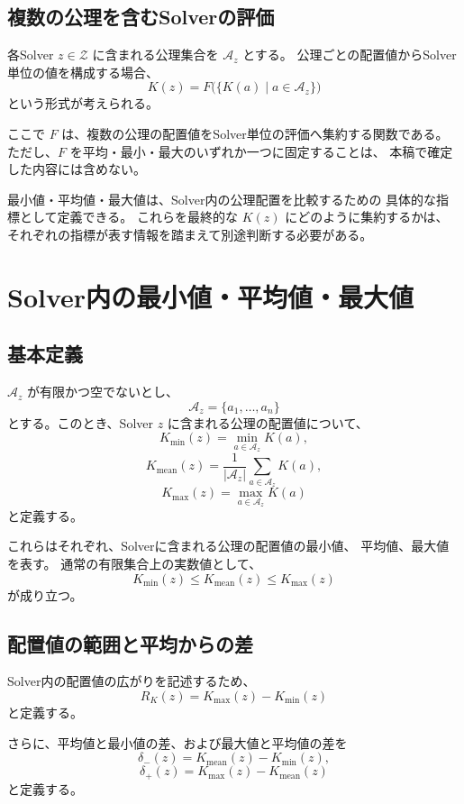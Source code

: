 \documentclass[a4paper,12pt]{article}
\begin{document}
\subsection{複数の公理を含むSolverの評価}

各Solver $z\in\mathcal{Z}$ に含まれる公理集合を
$\mathcal{A}_z$ とする。
公理ごとの配置値からSolver単位の値を構成する場合、
\[
    K(z)=F\bigl(\{K(a)\mid a\in\mathcal{A}_z\}\bigr)
\]
という形式が考えられる。

ここで $F$ は、複数の公理の配置値をSolver単位の評価へ集約する関数である。
ただし、$F$ を平均・最小・最大のいずれか一つに固定することは、
本稿で確定した内容には含めない。

最小値・平均値・最大値は、Solver内の公理配置を比較するための
具体的な指標として定義できる。
これらを最終的な $K(z)$ にどのように集約するかは、
それぞれの指標が表す情報を踏まえて別途判断する必要がある。

\section{Solver内の最小値・平均値・最大値}

\subsection{基本定義}

$\mathcal{A}_z$ が有限かつ空でないとし、
\[
    \mathcal{A}_z=\{a_1,\ldots,a_n\}
\]
とする。このとき、Solver $z$ に含まれる公理の配置値について、
\[
    K_{\min}(z)
    =
    \min_{a\in\mathcal{A}_z}K(a),
\]
\[
    K_{\mathrm{mean}}(z)
    =
    \frac{1}{|\mathcal{A}_z|}
    \sum_{a\in\mathcal{A}_z}K(a),
\]
\[
    K_{\max}(z)
    =
    \max_{a\in\mathcal{A}_z}K(a)
\]
と定義する。

これらはそれぞれ、Solverに含まれる公理の配置値の最小値、
平均値、最大値を表す。
通常の有限集合上の実数値として、
\[
    K_{\min}(z)
    \leq K_{\mathrm{mean}}(z)
    \leq K_{\max}(z)
\]
が成り立つ。

\subsection{配置値の範囲と平均からの差}

Solver内の配置値の広がりを記述するため、
\[
    R_K(z)=K_{\max}(z)-K_{\min}(z)
\]
と定義する。

さらに、平均値と最小値の差、および最大値と平均値の差を
\[
    \delta_-(z)
    =
    K_{\mathrm{mean}}(z)-K_{\min}(z),
\]
\[
    \delta_+(z)
    =
    K_{\max}(z)-K_{\mathrm{mean}}(z)
\]
と定義する。
\end{document}
